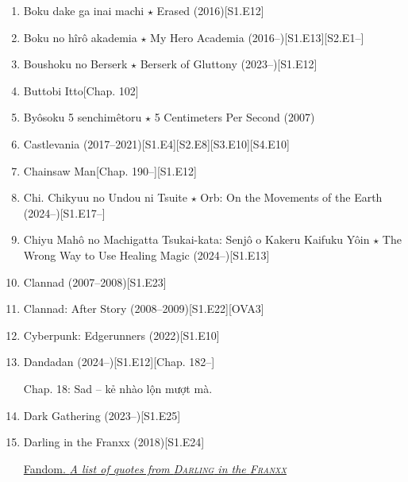 \documentclass{article}
\begin{document}
\begin{enumerate}
\begin{itemize}
    \end{itemize}
    \item {\sc Boku dake ga inai machi $\star$ Erased} (2016)\hfill[S1.E12]
    \item Boku no hîrô akademia $\star$ My Hero Academia (2016--)\hfill[S1.E13][S2.E1--]
    \item {\sc Boushoku no Berserk $\star$ Berserk of Gluttony} (2023--)\hfill[S1.E12]
    \item {\sc Buttobi Itto}\hfill[Chap. 102]
    \item {\sc By\^osoku 5 senchimêtoru $\star$ 5 Centimeters Per Second} (2007)
    \item {\sc Castlevania} (2017--2021)\hfill[S1.E4][S2.E8][S3.E10][S4.E10]
    \item {\sc Chainsaw Man}\hfill[Chap. 190--][S1.E12]
    \item Chi. Chikyuu no Undou ni Tsuite $\star$ Orb: On the Movements of the Earth (2024--)\hfill[S1.E17--]
    \item {\sc Chiyu Mahô no Machigatta Tsukai-kata: Senjô o Kakeru Kaifuku Yôin $\star$ The Wrong Way to Use Healing Magic} (2024--)[S1.E13]
    \item {\sc Clannad} (2007--2008)\hfill[S1.E23]
    \item {\sc Clannad: After Story} (2008--2009)\hfill[S1.E22][OVA3]
    \item {\sc Cyberpunk: Edgerunners} (2022)\hfill[S1.E10]
    \item Dandadan (2024--)\hfill[S1.E12][Chap. 182--]
    
    Chap. 18: Sad -- kẻ nhào lộn mượt mà.
    \item {\sc Dark Gathering} (2023--)\hfill[S1.E25]
    \item {\sc Darling in the Franxx} (2018)\hfill[S1.E24]
    
    \href{https://darling-in-the-franxx.fandom.com/wiki/List_of_Quotes}{Fandom. {\it A list of quotes from \textsc{Darling} in the \textsc{Franxx}}}
    

\end{enumerate}
\end{document}
